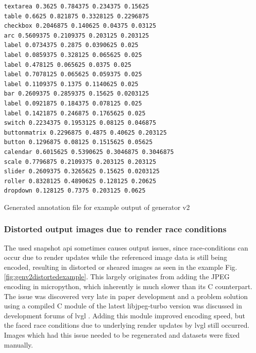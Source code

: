 \documentclass[Bachelor, BIC, english, fhCitStyle, IEEE]{BASE/twbook} %
\newcommand{\nocontentsline}[3]{}
\newcommand{\hidsubsubsection}[1]{\bgroup\let\addcontentsline=\nocontentsline\subsubsection{#1}\egroup}
\begin{document}
\begin{listing}[htbp]
    \begin{verbatim}
textarea 0.3625 0.784375 0.234375 0.15625
table 0.6625 0.821875 0.3328125 0.2296875
checkbox 0.2046875 0.140625 0.04375 0.03125
arc 0.5609375 0.2109375 0.203125 0.203125
label 0.0734375 0.2875 0.0390625 0.025
label 0.0859375 0.328125 0.065625 0.025
label 0.478125 0.065625 0.0375 0.025
label 0.7078125 0.065625 0.059375 0.025
label 0.1109375 0.1375 0.1140625 0.025
bar 0.2609375 0.2859375 0.15625 0.0203125
label 0.0921875 0.184375 0.078125 0.025
label 0.1421875 0.246875 0.1765625 0.025
switch 0.2234375 0.1953125 0.08125 0.046875
buttonmatrix 0.2296875 0.4875 0.40625 0.203125
button 0.1296875 0.08125 0.1515625 0.05625
calendar 0.6015625 0.5390625 0.3046875 0.3046875
scale 0.7796875 0.2109375 0.203125 0.203125
slider 0.2609375 0.3265625 0.15625 0.0203125
roller 0.8328125 0.4890625 0.128125 0.20625
dropdown 0.128125 0.7375 0.203125 0.0625
    \end{verbatim}
    \caption{Generated annotation file for example output of generator v2}
\end{listing}
\clearpage
\hidsubsubsection{Distorted output images due to render race conditions}
\noindent
The used snapshot \ac{api} sometimes causes output issues, since race-conditions can occur due to render updates while the referenced image data is still being encoded, resulting in distorted or sheared images as seen in the example Fig.\ref{fig:genv2distortedexample}. This largely originates from adding the JPEG encoding in micropython, which inherently is much slower than its C counterpart. The issue was discovered very late in paper development and a problem solution using a compiled C module of the latest libjpeg-turbo \autocite{LibjpegturboLibjpegturbo2024} version was discussed in development forums of \ac{lvgl} \autocite{HowCanStore2024}. Adding this module improved encoding speed, but the faced race conditions due to underlying render updates by \ac{lvgl} still occurred. Images which had this issue needed to be regenerated and datasets were fixed manually.
\end{document}
